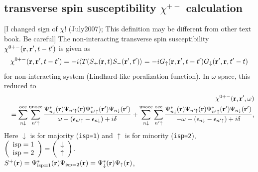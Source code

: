 \documentclass[a4paper,10pt,epsf,fleqn]{article}
\newcommand{\bfr}{{\bf r}}
\newcommand{\ispone}{\downarrow}
\newcommand{\isptwo}{\uparrow}
\begin{document}
\subsection{transverse spin susceptibility $\chi^{+-}$ calculation} 
\label{chipmcal}
[I changed sign of $\chi$! (July2007); This definition may be different from other text book. Be careful]
The non-interacting transverse spin susceptibility 
$\chi^{0+-}(\bfr,\bfr',t-t')$ is given as
\begin{eqnarray}
\chi^{0+-}(\bfr,\bfr',t-t') = 
-i\langle T(S_+(\bfr,t) S_-(\bfr',t') \rangle
=- i G_\isptwo(\bfr,\bfr',t-t') G_\ispone(\bfr',\bfr,t'-t) 
\label{generalchi0t}
\end{eqnarray}
for non-interacting system (Lindhard-like poralization function).
In $\omega$ space, this reduced to
\begin{eqnarray}
&&\chi^{0+-}(\bfr,\bfr',\omega) \nonumber \\
&&= 
\sum^{\rm  occ}_{n \ispone} \sum^{\rm  unocc}_{n'\isptwo}
\frac{
\Psi_{n\ispone}^*(\bfr)      \Psi_{n'\isptwo}(\bfr)
\Psi_{n'\isptwo}^*(\bfr') \Psi_{n\ispone}(\bfr') 
}{\omega-(\epsilon_{n'\isptwo}-\epsilon_{n\ispone})+i \delta} 
+ \sum^{\rm  unocc}_{n \ispone} \sum^{\rm occ}_{n'\isptwo}
\frac{
\Psi_{n\ispone}^*(\bfr)      \Psi_{n'\isptwo}(\bfr)
\Psi_{n'\isptwo}^*(\bfr') \Psi_{n\ispone}(\bfr') 
}{-\omega-(\epsilon_{n\ispone}-\epsilon_{n'\isptwo})+i \delta},
\label{generalchi0}
\end{eqnarray}
Here $\ispone$ is for majority ({\tt isp=1}) and 
$\isptwo$ is for minority ({\tt isp=2}), 
$\left(
 \begin{array}{c} {\rm isp=1} \\ 
                  {\rm isp=2} 
  \end{array}   
\right) =
\left(
 \begin{array}{c} \ispone \\ 
                 \isptwo 
  \end{array}   
\right)$. \\
   
\noindent $S^+(\bfr) = \Psi_{\rm isp=1}^*(\bfr) \Psi_{\rm isp=2}(\bfr) 
= \Psi_{\rm \ispone}^*(\bfr) \Psi_{\rm \isptwo}(\bfr)$, 
\end{document}
